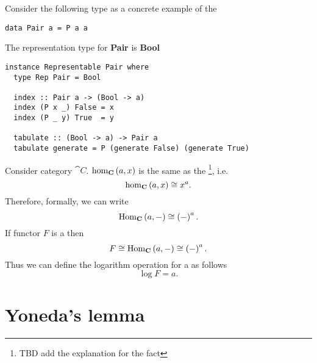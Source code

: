 \begin{example}
Consider the following type as a concrete example of the
\begin{verbatim}
data Pair a = P a a
\end{verbatim} 
The representation type for \textbf{Pair} is \textbf{Bool}
\begin{verbatim}
instance Representable Pair where
  type Rep Pair = Bool

  index :: Pair a -> (Bool -> a)
  index (P x _) False = x
  index (P _ y) True  = y

  tabulate :: (Bool -> a) -> Pair a
  tabulate generate = P (generate False) (generate True)
\end{verbatim} 

\end{example}

\begin{remark}
Consider category $\cat{C}$. 
$\catmset[C]{a}{x}$ is the same as the  
\footnote{TBD add the explanation for the fact}, i.e.
\[
\catmset[C]{a}{x} \cong x^a.
\]
Therefore, formally, we can write
\[
\mathrm{Hom}_{\mathbf{C}}\left(a, -\right) \cong \left(-\right)^a.
\]
If functor $F$ is a  then
\[
F \cong \mathrm{Hom}_{\mathbf{C}}\left(a, -\right) \cong \left(-\right)^a.
\]
Thus we can define the logarithm operation for a
 as follows
\[
\log F = a.
\]
\end{remark}

\section{Yoneda's lemma}

